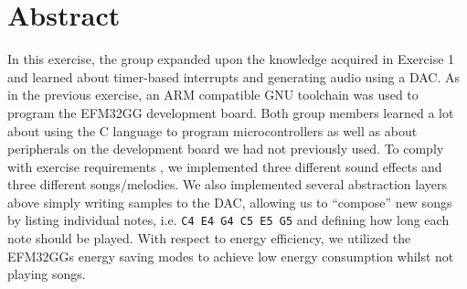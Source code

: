 \chapter*{Abstract}


In this exercise, the group expanded upon the knowledge acquired in Exercise 1 \cite{exercise1report} and learned about timer-based interrupts and generating audio using a DAC. As in the previous exercise, an ARM compatible GNU toolchain was used to program the EFM32GG development board. Both group members learned a lot about using the C language to program microcontrollers as well as about peripherals on the development board we had not previously used. To comply with exercise requirements \cite[p.~42]{compendium}, we implemented three different sound effects and three different songs/melodies. We also implemented several abstraction layers above simply writing samples to the DAC, allowing us to ``compose'' new songs by listing individual notes, i.e. \texttt{C4 E4 G4 C5 E5 G5} and defining how long each note should be played. With respect to energy efficiency, we utilized the EFM32GGs energy saving modes to achieve low energy consumption whilst not playing songs.
